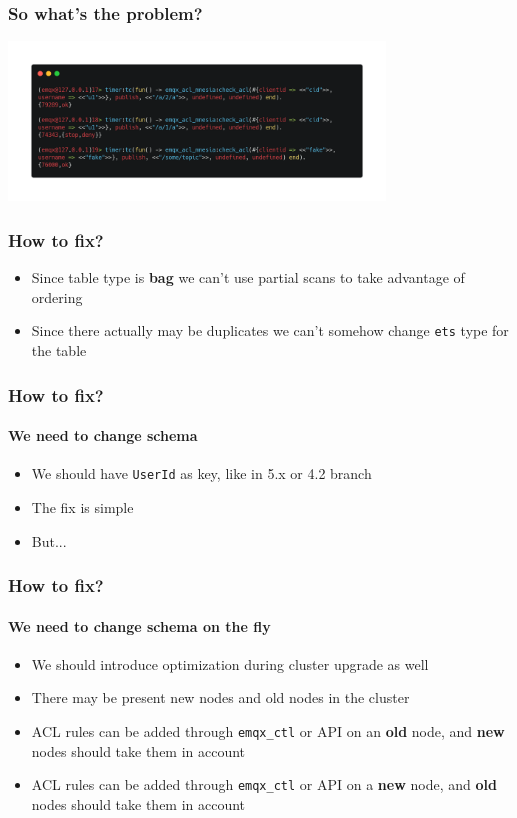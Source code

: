 \documentclass{beamer}
\begin{document}
\begin{frame}
    \frametitle{So what's the problem?}

    \begin{center}
        \includegraphics[width=10cm, keepaspectratio]{images/old-lookup-code-tc.png}
    \end{center}
\end{frame}

\begin{frame}
    \frametitle{How to fix?}

    \begin{itemize}
        \item Since table type is \textbf{bag} we can't use partial scans to take advantage of ordering
        \item Since there actually may be duplicates we can't somehow change \lstinline{ets} type for the table
    \end{itemize}
\end{frame}

\begin{frame}
    \frametitle{How to fix?}
    \framesubtitle{We need to change schema}

    \begin{itemize}
        \item We should have \lstinline{UserId} as key, like in 5.x or 4.2 branch
        \item The fix is simple
        \item But...
    \end{itemize}
\end{frame}

\begin{frame}
    \frametitle{How to fix?}
    \framesubtitle{We need to change schema on the fly}

    \begin{itemize}
        \item We should introduce optimization during cluster upgrade as well
        \item There may be present new nodes and old nodes in the cluster
        \item ACL rules can be added through \lstinline{emqx_ctl} or API on an \textbf{old} node, and \textbf{new}
        nodes should take them in account
        \item ACL rules can be added through \lstinline{emqx_ctl} or API on a \textbf{new} node, and \textbf{old}
        nodes should take them in account
    \end{itemize}
\end{frame}
\end{document}
